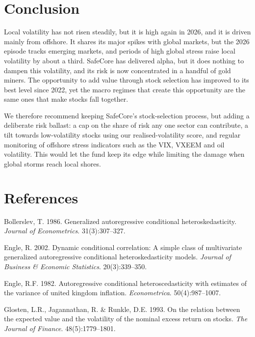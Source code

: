 \documentclass[11pt,preprint]{elsarticle}
\numberwithin{equation}{section}
\numberwithin{figure}{section}
\numberwithin{table}{section}
\newlength{\cslhangindent}
\newenvironment{CSLReferences}[2] %
{\begin{list}{}{%
	\setlength{\itemindent}{0pt}
	\setlength{\leftmargin}{0pt}
	\setlength{\parsep}{0pt}
	\ifodd #1
	\setlength{\leftmargin}{\cslhangindent}
	\setlength{\itemindent}{-1\cslhangindent}
	\fi
	\setlength{\itemsep}{#2\baselineskip}}}
{\end{list}}
\begin{document}
\section{\texorpdfstring{Conclusion
\label{Conclusion}}{Conclusion }}\label{conclusion}

Local volatility has not risen steadily, but it is high again in 2026,
and it is driven mainly from offshore. It shares its major spikes with
global markets, but the 2026 episode tracks emerging markets, and
periods of high global stress raise local volatility by about a third.
SafeCore has delivered alpha, but it does nothing to dampen this
volatility, and its risk is now concentrated in a handful of gold
miners. The opportunity to add value through stock selection has
improved to its best level since 2022, yet the macro regimes that create
this opportunity are the same ones that make stocks fall together.

We therefore recommend keeping SafeCore's stock-selection process, but
adding a deliberate risk ballast: a cap on the share of risk any one
sector can contribute, a tilt towards low-volatility stocks using our
realised-volatility score, and regular monitoring of offshore stress
indicators such as the VIX, VXEEM and oil volatility. This would let the
fund keep its edge while limiting the damage when global storms reach
local shores.

\newpage

\section*{References}\label{references}

\protect{}\label{refs}
\begin{CSLReferences}{1}{1}
Bollerslev, T. 1986. Generalized autoregressive conditional
heteroskedasticity. \emph{Journal of Econometrics}. 31(3):307--327.

Engle, R. 2002. Dynamic conditional correlation: A simple class of
multivariate generalized autoregressive conditional heteroskedasticity
models. \emph{Journal of Business \& Economic Statistics}.
20(3):339--350.

Engle, R.F. 1982. Autoregressive conditional heteroscedasticity with
estimates of the variance of united kingdom inflation.
\emph{Econometrica}. 50(4):987--1007.

Glosten, L.R., Jagannathan, R. \& Runkle, D.E. 1993. On the relation
between the expected value and the volatility of the nominal excess
return on stocks. \emph{The Journal of Finance}. 48(5):1779--1801.

\end{CSLReferences}


\end{document}

